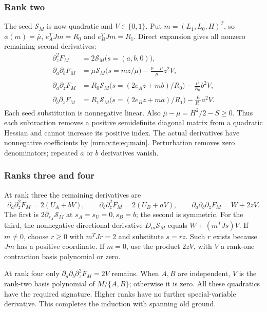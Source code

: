 \documentclass[11pt,a4paper]{article}
\theoremstyle{remark}\newtheorem{remark}[theorem]{Remark}
\begin{document}
\subsubsection{Rank two}
The seed $\mathcal S_M$ is now quadratic and $V\in\{0,1\}$. Put $m=(L_1,L_0,H)^T$, so $\phi(m)=\bar\mu$, $e_A^TJm=R_0$ and $e_B^TJm=R_1$. Direct expansion gives all nonzero remaining second derivatives:
\begin{align}
 \partial_z^2F_M&=2\mathcal S_M\bigl(s=(a,b,0)\bigr),\nonumber\\
 \partial_a\partial_bF_M
   &=\mu\mathcal S_M\bigl(s=mz/\mu\bigr)
        -\frac{\bar\mu-\mu}{\mu}z^2V,\label{mrn:v:te:eq:rank2}\\
 \partial_a\partial_zF_M
   &=R_0\mathcal S_M\bigl(s=(2e_Az+mb)/R_0\bigr)
        -\frac{\bar\mu}{R_0}b^2V,\nonumber\\
 \partial_b\partial_zF_M
   &=R_1\mathcal S_M\bigl(s=(2e_Bz+ma)/R_1\bigr)
        -\frac{\bar\mu}{R_1}a^2V.\nonumber
\end{align}
Each seed substitution is nonnegative linear. Also $\bar\mu-\mu=H^2/2-S\ge0$. Thus each subtraction removes a positive semidefinite diagonal matrix from a quadratic Hessian and cannot increase its positive index. The actual derivatives have nonnegative coefficients by \eqref{mrn:v:te:eq:main}. Perturbation removes zero denominators; repeated $a$ or $b$ derivatives vanish.

\subsubsection{Ranks three and four}
At rank three the remaining derivatives are
\[
 \partial_a\partial_z^2F_M=2(U_A+bV),\qquad
 \partial_b\partial_z^2F_M=2(U_B+aV),\qquad
 \partial_a\partial_b\partial_zF_M=W+2zV.
\]
The first is $2\partial_{s_A}\mathcal S_M$ at $s_A=s_U=0,s_B=b$; the second is symmetric. For the third, the nonnegative directional derivative $D_m\mathcal S_M$ equals $W+(m^TJs)V$. If $m\ne0$, choose $r\ge0$ with $m^TJr=2$ and substitute $s=rz$. Such $r$ exists because $Jm$ has a positive coordinate. If $m=0$, use the product $2zV$, with $V$ a rank-one contraction basis polynomial or zero.

At rank four only $\partial_a\partial_b\partial_z^2F_M=2V$ remains. When $A,B$ are independent, $V$ is the rank-two basis polynomial of $M/\{A,B\}$; otherwise it is zero. All these quadratics have the required signature. Higher ranks have no further special-variable derivative. This completes the induction with spanning old ground.
\end{document}
